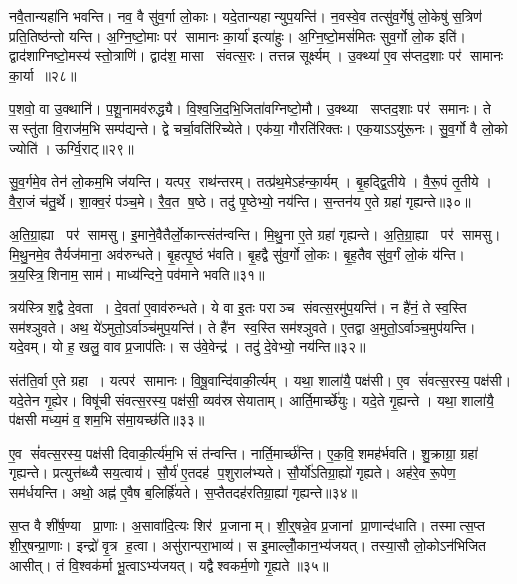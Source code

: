 नवै॒तान्यहा॑नि भवन्ति। नव॒ वै सु॑व॒र्गा लो॒काः। यदे॒तान्यहान्युप॒यन्ति॑। न॒वस्वे॒व तत्सु॑व॒र्गेषु॑ लो॒केषु॑ स॒त्रिण॑ प्रति॒तिष्ठ॑न्तो यन्ति। अ॒ग्नि॒ष्टो॒माः पर॑ सामानः का॒र्या॑ इत्या॑हुः। अ॒ग्नि॒ष्टो॒मसं॑मितः सुव॒र्गो लो॒क इति॑। द्वाद॑शाग्निष्टो॒मस्य॑ स्तो॒त्राणि॑। द्वाद॑श॒ मासा संवत्स॒रः। तत्तन्न सूर्क्ष्यम्। उ॒क्थ्या॑ ए॒व स॑प्तद॒शाः पर॑ सामानः का॒र्या॥२८॥

प॒शवो॒ वा उ॒क्थानि॑। प॒शू॒नामव॑रुद्ध्यै। वि॒श्व॒जि॒द॒भि॒जिता॑\-वग्निष्टो॒मौ। उ॒क्थ्या सप्तद॒शाः पर॑ समानः। ते सस्तु॑ता वि॒राज॑म॒भि सम्प॑द्यन्ते। द्वे चर्चा॒वति॑रिच्येते। एक॑या॒ गौरति॑रिक्तः। एक॒याऽऽयु॑रू॒नः। सु॒व॒र्गो वै लो॒को ज्योति॑। ऊर्ग्वि॒राट्॥२९॥

सु॒व॒र्गमे॒व तेन॑ लो॒कम॒भि ज॑यन्ति। यत्पर॒ राथ॑न्तरम्। तत्प्र॑थ॒मेऽह॑न्का॒र्यम्। बृ॒हद्द्वि॒तीये। वै॒रू॒पं तृ॒तीये। वै॒रा॒जं च॑तु॒र्थे। शा॒क्व॒रं प॑ञ्च॒मे। रै॒व॒त ष॒ष्ठे। तदु॑ पृ॒ष्ठेभ्यो॒ नय॑न्ति। स॒न्तन॑य ए॒ते ग्रहा॑ गृह्यन्ते॥३०॥

अ॒ति॒ग्रा॒ह्या पर॑ सामसु। इ॒माने॒वैतैर्लो॒कान्त्संत॑न्वन्ति। मि॒थु॒ना ए॒ते ग्रहा॑ गृह्यन्ते। अ॒ति॒ग्रा॒ह्या पर॑ सामसु। मि॒थु॒नमे॒व तैर्यज॑माना॒ अव॑रुन्धते। बृ॒हत्पृ॒ष्ठं भ॑वति। बृ॒हद्वै सु॑व॒र्गो लो॒कः। बृ॒ह॒तैव सु॑व॒र्गं लो॒कं य॑न्ति। त्र॒य॒स्त्रि॒शिनाम॒ साम॑। माध्य॑न्दिने॒ पव॑माने भवति॥३१॥

त्रय॑स्त्रिश॒द्वै दे॒वता। दे॒वता॑ ए॒वाव॑रुन्धते। ये वा इ॒तः पराञ्च संवत्स॒रमु॑प॒यन्ति॑। न है॑नं॒ ते स्व॒स्ति सम॑श्ञुवते। अथ॒ ये॑ऽमुतो॒ऽर्वाञ्च॑मुप॒यन्ति॑। ते है॑न स्व॒स्ति सम॑श्ञुवते। ए॒तद्वा अ॒मुतो॒ऽर्वाञ्च॒मुप॑यन्ति। यदे॒वम्। यो ह॒ खलु॒ वाव प्र॒जाप॑तिः। स उ॑वे॒वेन्द्र॑। तदु॑ दे॒वेभ्यो॒ नय॑न्ति॥३२॥\anuvakamend[का॒र्या॑ वि॒राड्गृ॑ह्यन्ते॒ पव॑माने भव॒तीन्द्र॒ एकं॑ च]

संत॑ति॒र्वा ए॒ते ग्रहा। यत्पर॑ सामानः। वि॒षू॒वान्दि॑वाकी॒र्त्यम्। यथा॒ शाला॑यै॒ पक्ष॑सी। ए॒व सं॑वत्स॒रस्य॒ पक्ष॑सी। यदे॒तेन गृ॒ह्येर\sn{}। विषू॑ची संवत्स॒रस्य॒ पक्ष॑सी॒ व्यव॑स्रसेयाताम्। आर्ति॒मार्च्छे॑युः। यदे॒ते गृ॒ह्यन्ते। यथा॒ शाला॑यै॒ प॑क्षसी मध्य॒मं व॒शम॒भि स॑मा॒यच्छ॑ति॥३३॥

ए॒व सं॑वत्स॒रस्य॒ पक्ष॑सी दिवाकी॒र्त्य॑म॒भि सं त॑न्वन्ति। नार्ति॒मार्च्छ॑न्ति। ए॒क॒वि॒शमह॑र्भवति। शु॒क्राग्रा॒ ग्रहा॑ गृह्यन्ते। प्रत्युत्त॑ब्ध्यै सय॒त्वाय॑। सौ॒र्य॑ ए॒तदह॑ प॒शुराल॑भ्यते। सौ॒र्यो॑ऽतिग्रा॒ह्यो॑ गृह्यते। अह॑रे॒व रू॒पेण॒ सम॑र्धयन्ति। अथो॒ अह्न॑ ए॒वैष ब॒लिर्ह्रि॑यते। स॒प्तैतदह॑रतिग्रा॒ह्या॑ गृह्यन्ते॥३४॥

स॒प्त वै शी॑र्\mbox{}ष॒ण्या प्रा॒णाः। अ॒सावा॑दि॒त्यः शिर॑ प्र॒जानाम्। शी॒र्॒षन्ने॒व प्र॒जानां प्रा॒णान्द॑धाति। तस्मात्स॒प्त शी॒र्॒षन्प्रा॒णाः। इन्द्रो॑ वृ॒त्र ह॒त्वा। असु॑रान्परा॒भाव्य॑। स इ॒माल्लोँ॒कान॒भ्य॑जयत्। तस्या॒सौ लो॒कोऽन॑भिजित आसीत्। तं वि॒श्वक॑र्मा भू॒त्वाऽभ्य॑जयत्। यद्वैश्वकर्म॒णो गृ॒ह्यते॥३५॥

